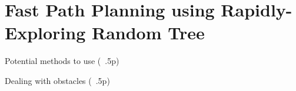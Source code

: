 \section{Fast Path Planning using Rapidly-Exploring Random Tree \label{sec:rrt}}
Potential methods to use (~.5p)

Dealing with obstacles (~.5p)